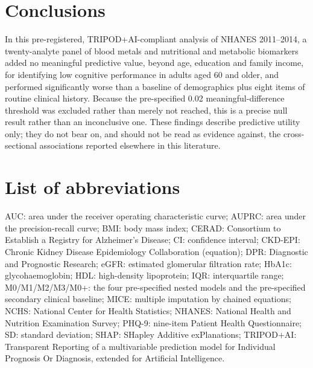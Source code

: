 \documentclass[12pt]{article}
\begin{document}
\section*{Conclusions}

In this pre-registered, TRIPOD+AI-compliant analysis of NHANES 2011--2014, a twenty-analyte panel of blood metals and nutritional and metabolic biomarkers added no meaningful predictive value, beyond age, education and family income, for identifying low cognitive performance in adults aged 60 and older, and performed significantly worse than a baseline of demographics plus eight items of routine clinical history. Because the pre-specified 0.02 meaningful-difference threshold was excluded rather than merely not reached, this is a precise null result rather than an inconclusive one. These findings describe predictive utility only; they do not bear on, and should not be read as evidence against, the cross-sectional associations reported elsewhere in this literature.

\section*{List of abbreviations}

\begin{singlespace}
\noindent AUC: area under the receiver operating characteristic curve; AUPRC: area under the precision-recall curve; BMI: body mass index; CERAD: Consortium to Establish a Registry for Alzheimer's Disease; CI: confidence interval; CKD-EPI: Chronic Kidney Disease Epidemiology Collaboration (equation); DPR: Diagnostic and Prognostic Research; eGFR: estimated glomerular filtration rate; HbA1c: glycohaemoglobin; HDL: high-density lipoprotein; IQR: interquartile range; M0/M1/M2/M3/M0+: the four pre-specified nested models and the pre-specified secondary clinical baseline; MICE: multiple imputation by chained equations; NCHS: National Center for Health Statistics; NHANES: National Health and Nutrition Examination Survey; PHQ-9: nine-item Patient Health Questionnaire; SD: standard deviation; SHAP: SHapley Additive exPlanations; TRIPOD+AI: Transparent Reporting of a multivariable prediction model for Individual Prognosis Or Diagnosis, extended for Artificial Intelligence.
\end{singlespace}
\end{document}
